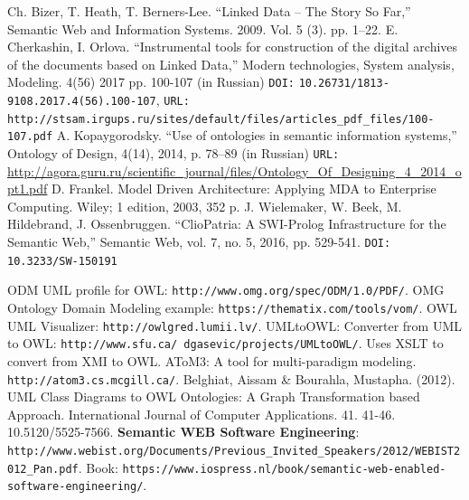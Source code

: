 \documentclass[conference,a4paper]{IEEEtran}
\providecommand\url[1]{\texttt{#1}}
\begin{document}

%
%
%
\begin{thebibliography}{11}


 Ch. Bizer, T. Heath, T. Berners-Lee. ``Linked Data – The Story So Far,'' Semantic Web and Information Systems. 2009. Vol. 5 (3). pp. 1–22.
 E. Cherkashin, I. Orlova. ``Instrumental tools for construction of the digital archives of the documents based on Linked Data,'' Modern technologies, System analysis, Modeling. 4(56) 2017 pp. 100-107 (in Russian) \texttt{DOI:} \url{10.26731/1813-9108.2017.4(56).100-107}, \texttt{URL:} \url{http://stsam.irgups.ru/sites/default/files/articles\_pdf\_files/100-107.pdf}
 A. Kopaygorodsky. ``Use of ontologies in semantic information systems,'' Ontology of Design, 4(14), 2014, p. 78--89 (in Russian) \texttt{URL:} \href{http://agora.guru.ru/scientific_journal/files/Ontology_Of_Designing_4_2014_opt1.pdf#page=79}{\ttfamily http://agora.guru.ru/scientific\_journal/files/On\-tology\_Of\_Designing\_4\_2014\_opt1.pdf}
 D. Frankel. Model Driven Architecture: Applying MDA to Enterprise Computing. Wiley; 1 edition, 2003, 352 p.
 J. Wielemaker, W. Beek, M. Hildebrand, J. Ossenbruggen. ``ClioPatria: A SWI-Prolog Infrastructure for the Semantic Web,'' Semantic Web, vol. 7, no. 5, 2016, pp. 529-541. \texttt{DOI:} \url{10.3233/SW-150191}

 ODM UML profile for OWL: \url{http://www.omg.org/spec/ODM/1.0/PDF/}.
 OMG Ontology Domain Modeling example: \url{https://thematix.com/tools/vom/}.
 OWL UML Visualizer: \url{http://owlgred.lumii.lv/}.
 UMLtoOWL: Converter from UML to OWL: \url{http://www.sfu.ca/~dgasevic/projects/UMLtoOWL/}. Uses XSLT to convert from XMI to OWL.
 AToM3: A tool for multi-paradigm modeling. \url{http://atom3.cs.mcgill.ca/}.
 Belghiat, Aissam \& Bourahla, Mustapha. (2012). UML Class Diagrams to OWL Ontologies: A Graph Transformation based Approach. International Journal of Computer Applications. 41. 41-46. 10.5120/5525-7566.
 \textbf{Semantic WEB Software Engineering}: \url{http://www.webist.org/Documents/Previous\_Invited\_Speakers/2012/WEBIST2012\_Pan.pdf}. Book: \url{https://www.iospress.nl/book/semantic-web-enabled-software-engineering/}.


\end{thebibliography}
\end{document}
